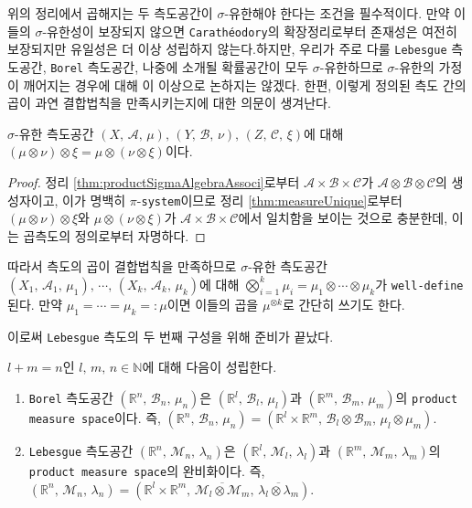 위의 정리에서 곱해지는 두 측도공간이 $\sigma$-유한해야 한다는 조건을 필수적이다. 만약 이들의 $\sigma$-유한성이 보장되지 않으면 \texttt{Carath\'eodory}의 확장정리로부터 존재성은 여전히 보장되지만 유일성은 더 이상 성립하지 않는다.\footnotemark 하지만, 우리가 주로 다룰 \texttt{Lebesgue} 측도공간, \texttt{Borel} 측도공간, 나중에 소개될 확률공간이 모두 $\sigma$-유한하므로 $\sigma$-유한의 가정이 깨어지는 경우에 대해 이 이상으로 논하지는 않겠다. 한편, 이렇게 정의된 측도 간의 곱이 과연 결합법칙을 만족시키는지에 대한 의문이 생겨난다.

\begin{theorem}
    $\sigma$-유한 측도공간 $(X,\,\mathcal{A},\,\mu),\,(Y,\,\mathcal{B},\,\nu),\,(Z,\,\mathcal{C},\,\xi)$에 대해 $(\mu\otimes\nu)\otimes\xi=\mu\otimes(\nu\otimes\xi)$이다.
\end{theorem}

\begin{proof}
    정리 \ref{thm:productSigmaAlgebraAssoci}로부터 $\mathcal{A}\times\mathcal{B}\times\mathcal{C}$가 $\mathcal{A}\otimes\mathcal{B}\otimes\mathcal{C}$의 생성자이고, 이가 명백히 $\pi$-\texttt{system}이므로 정리 \ref{thm:measureUnique}로부터 $(\mu\otimes\nu)\otimes\xi$와 $\mu\otimes(\nu\otimes\xi)$가 $\mathcal{A}\times\mathcal{B}\times\mathcal{C}$에서 일치함을 보이는 것으로 충분한데, 이는 곱측도의 정의로부터 자명하다.
\end{proof}

따라서 측도의 곱이 결합법칙을 만족하므로 $\sigma$-유한 측도공간 $(X_1,\,\mathcal{A}_1,\,\mu_1),\,\cdots,\,(X_k,\,\mathcal{A}_k,\,\mu_k)$에 대해 $\bigotimes_{i=1}^k\mu_i=\mu_1\otimes\cdots\otimes\mu_k$가 \texttt{well-define}된다. 만약 $\mu_1=\cdots=\mu_k=:\mu$이면 이들의 곱을 $\mu^{\otimes k}$로 간단히 쓰기도 한다.

이로써 \texttt{Lebesgue} 측도의 두 번째 구성을 위해 준비가 끝났다.

\begin{theorem}\label{thm:productLebesgue}
    $l+m=n$인 $l,\,m,\,n\in\mathbb{N}$에 대해 다음이 성립한다.
    \begin{enumerate}
        \item \texttt{Borel} 측도공간 $(\mathbb{R}^n,\,\mathcal{B}_n,\,\mu_n)$은 $(\mathbb{R}^l,\,\mathcal{B}_l,\,\mu_l)$과 $(\mathbb{R}^m,\,\mathcal{B}_m,\,\mu_m)$의 \texttt{product measure space}이다. 즉, $(\mathbb{R}^n,\,\mathcal{B}_n,\,\mu_n)=(\mathbb{R}^l\times\mathbb{R}^m,\,\mathcal{B}_l\otimes\mathcal{B}_m,\,\mu_l\otimes\mu_m)$.
        \item \texttt{Lebesgue} 측도공간 $(\mathbb{R}^n,\,\mathcal{M}_n,\,\lambda_n)$은 $(\mathbb{R}^l,\,\mathcal{M}_l,\,\lambda_l)$과 $(\mathbb{R}^m,\,\mathcal{M}_m,\,\lambda_m)$의 \texttt{product measure space}의 완비화이다. 즉, $(\mathbb{R}^n,\,\mathcal{M}_n,\,\lambda_n)=(\mathbb{R}^l\times\mathbb{R}^m,\,\overline{\mathcal{M}_l\otimes\mathcal{M}_m},\,\overline{\lambda_l\otimes\lambda_m})$.
    \end{enumerate}
\end{theorem}

